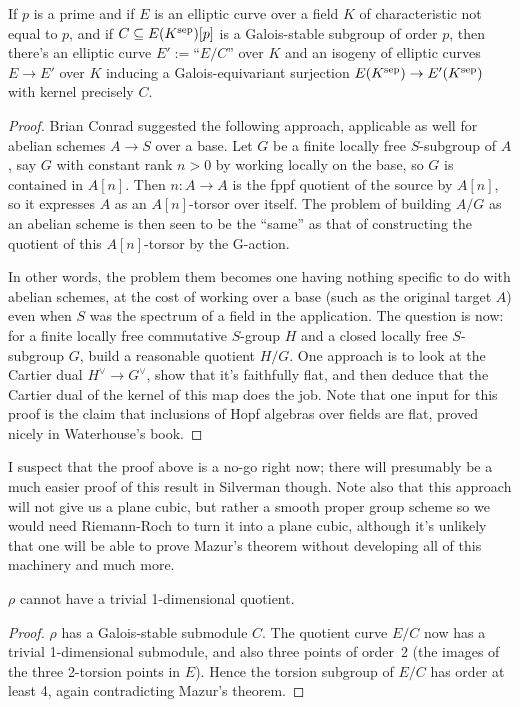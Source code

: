 \begin{theorem}\label{Elliptic_curve_quotient_by_finite_subgroup}\notready If $p$ is a prime and
  if $E$ is an elliptic curve over a field $K$ of characteristic not equal to $p$,
   and if $C\subseteq E(K^{\operatorname{sep}})[p]$ is a Galois-stable
  subgroup of order $p$, then there's an elliptic curve $E':=$``$E/C$'' over $K$ and an isogeny of elliptic 
  curves $E\to E'$ over $K$ inducing a Galois-equivariant surjection $E(K^{\operatorname{sep}})\to E'(K^{\operatorname{sep}})$ 
  with kernel precisely $C$.
\end{theorem}
\begin{proof}
  Brian Conrad suggested the following approach, applicable as well for abelian schemes $A\to S$ 
  over a base.  Let $G$ be a finite locally free $S$-subgroup of $A$, say $G$ with constant 
  rank $n > 0$ by working locally on the base, so $G$ is contained in $A[n]$.  Then 
  $n: A \to A$ is the fppf quotient of the source by $A[n]$, so it expresses $A$ as an 
  $A[n]$-torsor over itself.  The problem of building $A/G$ as an abelian scheme is then 
  seen to be the “same” as that of constructing the quotient of this $A[n]$-torsor by the G-action.

  In other words, the problem them becomes one having nothing specific to do with abelian schemes, 
  at the cost of working over a base (such as the original target $A$) even when $S$ was the 
  spectrum of a field in the application. The question is now: for a finite locally free 
  commutative $S$-group $H$ and a closed locally free $S$-subgroup $G$, build a reasonable quotient 
  $H/G$. One approach is to look at the Cartier dual $H^\vee\to G^\vee$, show that it's faithfully 
  flat, and then deduce that the Cartier dual of the kernel of this map does the job. Note that 
  one input for this proof is the claim that inclusions of Hopf algebras over fields are flat, 
  proved nicely in Waterhouse’s book.
\end{proof}

I suspect that the proof above is a no-go right now; there will presumably be a much easier proof of this result in Silverman though. Note also that this approach will not
give us a plane cubic, but rather a smooth proper group scheme so we would need Riemann-Roch
to turn it into a plane cubic, although it's unlikely that one will be able to prove Mazur's
theorem without developing all of this machinery and much more.

\begin{corollary}\label{Frey_curve_no_trivial_quotient} $\rho$ cannot have a trivial 1-dimensional quotient.
\end{corollary}
\begin{proof} $\rho$ has a Galois-stable submodule $C$. The quotient curve $E/C$ now has
  a trivial 1-dimensional submodule, and also three points of order~2 (the images of the three
  2-torsion points in $E$). Hence the torsion subgroup of $E/C$ has order at least 4\ell{}, 
  again contradicting Mazur's theorem.
\end{proof}

